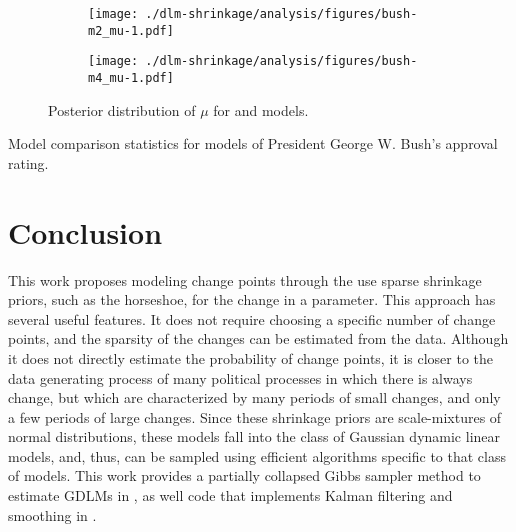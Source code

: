 \documentclass[12pt]{article}
\begin{document}
\begin{figure}[thbp!]
  \begin{subfigure}[b]{\linewidth}
    \texttt{[image: ./dlm-shrinkage/analysis/figures/bush-m2\_mu-1.pdf]}
    \caption{}
  \end{subfigure}

  \begin{subfigure}[b]{\linewidth}
    \texttt{[image: ./dlm-shrinkage/analysis/figures/bush-m4\_mu-1.pdf]}
    \caption{}
  \end{subfigure}
  \caption{Posterior distribution of $\mu$ for  and  models.}
  \label{dlm:fig:bush_mu2}
\end{figure}


\begin{table}[thbp!]
  \centering
  
  \caption{Model comparison statistics for models of President George W. Bush's approval rating.}
  \label{dlm:tab:bush_model_comp}
\end{table}



\section{Conclusion}
\label{dlm:sec:conclusion}


This work proposes modeling change points through the use sparse shrinkage priors, such as the horseshoe, for the change in a parameter.
This approach has several useful features.
It does not require choosing a specific number of change points, and the sparsity of the changes can be estimated from the data.
Although it does not directly estimate the probability of change points, it is closer to the data generating process of many political processes in which there is always change, but which are characterized by many periods of small changes, and only a few periods of large changes.
Since these shrinkage priors are scale-mixtures of normal distributions, these models fall into the class of Gaussian dynamic linear models, and, thus, can be sampled using efficient algorithms specific to that class of models.
This work provides a partially collapsed Gibbs sampler method to estimate GDLMs in \Stan{}, as well \Stan{} code that implements Kalman filtering and smoothing in \Stan{}.
\end{document}
